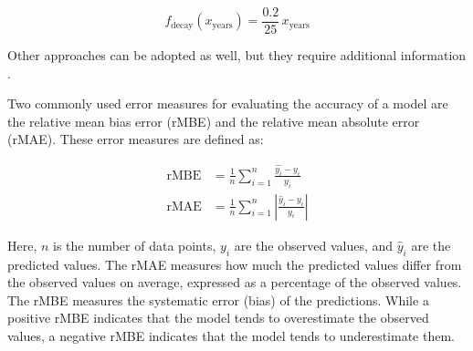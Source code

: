\begin{equation}
    f_{\text{decay}}(x_{\text{years}}) = \frac{0.2}{25} \, x_{\text{years}}
\end{equation}

\noindent
Other approaches can be adopted as well, but they require additional information \cite[p. 92]{Dolora2015}.

Two commonly used error measures for evaluating the accuracy of a
model are the relative mean bias error (rMBE) and the relative mean
absolute error (rMAE). These error measures are defined as:

\begin{align}
    \text{rMBE} &= \frac{1}{n} \sum_{i=1}^{n} \frac{\hat{y_i} - y_i}{y_i} \\
    \text{rMAE} &= \frac{1}{n} \sum_{i=1}^{n} \left| \frac{\hat{y}_i - y_i}{y_i} \right|
\end{align}

\noindent
Here, \(n\) is the number of data points, \(y_i\) are the observed values,
and \(\hat{y}_i\) are the predicted values. The rMAE measures how much the
predicted values differ from the observed values on average, expressed as a percentage
of the observed values. The rMBE measures the systematic error (bias) of
the predictions. While a positive rMBE indicates that the model tends
to overestimate the observed values, a negative rMBE indicates that the
model tends to underestimate them.

